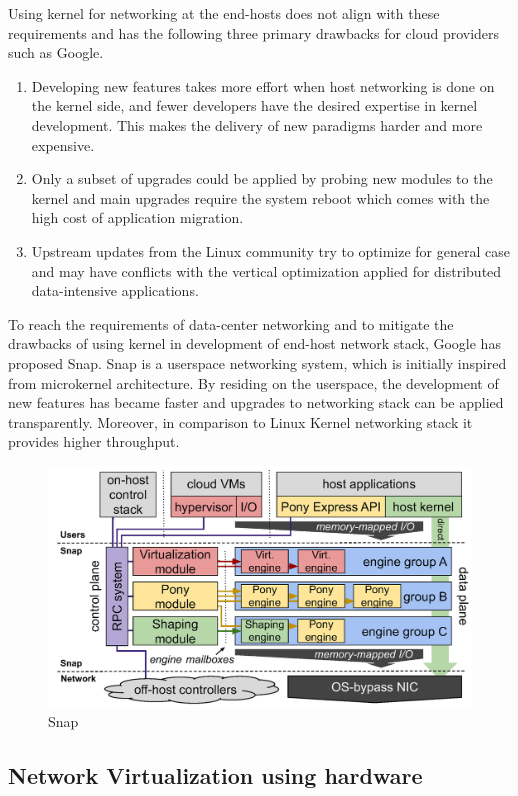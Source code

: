 Using kernel for networking at the end-hosts does not align with these 
requirements and has the following three primary drawbacks for 
cloud providers such as Google.

\begin{enumerate}
    \item Developing new features takes more effort 
    when host networking is done on the kernel side, and 
    fewer developers have the desired expertise in kernel development.
    This makes the delivery of new paradigms harder and more expensive.

    \item Only a subset of upgrades could be applied by probing new 
    modules to the kernel  and main upgrades require the system reboot 
    which comes with the high cost of application migration. 
    
    \item Upstream updates from the Linux community try to optimize for 
    general case and may have conflicts with the vertical optimization
    applied for distributed data-intensive applications.
\end{enumerate}

To reach the requirements of data-center networking and to mitigate the 
drawbacks of using kernel in development of end-host network stack, 
Google has proposed Snap. Snap is a userspace networking system, which is 
initially inspired from microkernel architecture. By residing on the  
userspace, the development of new features has became faster and 
upgrades to networking stack can be applied transparently. Moreover, in 
comparison to Linux Kernel networking stack it provides higher throughput.

\begin{figure}
\small
\center
\includegraphics[width=\textwidth]{../Figures/snap.png}
\caption{Snap}
\label{fig:snap}
\end{figure}

\subsection{Network Virtualization using hardware}
